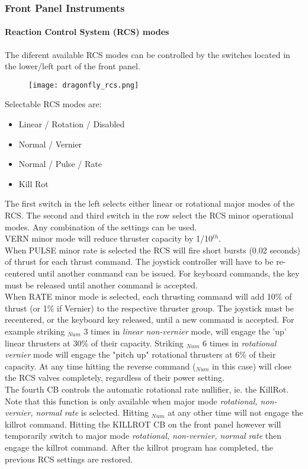 \documentclass[Orbiter User Manual.tex]{subfiles}
\begin{document}
\subsubsection{Front Panel Instruments}
\paragraph{Reaction Control System (RCS) modes}
The diferent available RCS modes can be controlled by the switches located in the lower/left part of the front panel.

\begin{figure}[H]
  \centering
  \texttt{[image: dragonfly\_rcs.png]}
\end{figure}

\noindent
Selectable RCS modes are:

\begin{itemize}
\item Linear / Rotation / Disabled
\item Normal / Vernier
\item Normal / Pulse / Rate
\item Kill Rot
\end{itemize}

\noindent
The first switch in the left selects either linear or rotational major modes of the RCS. The second and third switch in the row select the RCS minor operational modes. Any combination of the settings can be used.\\
VERN minor mode will reduce thruster capacity by 1/10$^{th}$.\\
When PULSE minor rate is selected the RCS will fire short bursts (0.02 seconds) of thrust for each thrust command. The joystick controller will have to be re-centered until another command can be issued. For keyboard commands, the key must be released until another command is accepted.\\
When RATE minor mode is selected, each thrusting command will add 10\% of thrust (or 1\% if Vernier) to the respective thruster group. The joystick must be recentered, or the keyboard key released, until a new command is accepted. For example striking $_{Num}$ 3 times in \textit{linear non-vernier} mode, will engage the 'up' linear thrusters at 30\% of their capacity. Striking $_{Num}$ 6 times in \textit{rotational vernier} mode will engage the "pitch up" rotational thrusters at 6\% of their capacity. At any time hitting the reverse command ($_{Num}$ in this case) will close the RCS valves completely, regardless of their power setting.\\
The fourth CB controls the automatic rotational rate nullifier, ie. the KillRot. Note that this function is only available when major mode \textit{rotational, non-vernier, normal rate} is selected. Hitting $_{Num}$ at any other time will not engage the killrot command. Hitting the KILLROT CB on the front panel however will temporarily switch to major mode \textit{rotational, non-vernier, normal rate} then engage the killrot command. After the killrot program has completed, the previous RCS settings are restored.
\end{document}
